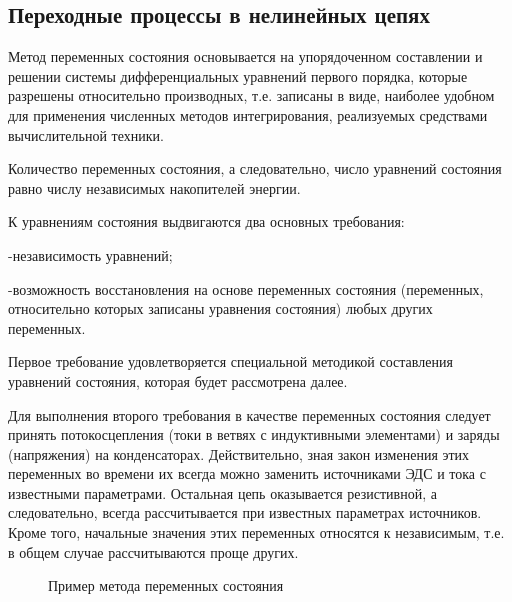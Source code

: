 \subsection{Переходные процессы в нелинейных цепях}



Метод переменных состояния основывается на упорядоченном составлении и решении системы дифференциальных уравнений первого порядка, которые разрешены относительно производных, т.е. записаны в виде, наиболее удобном для применения численных методов интегрирования, реализуемых средствами вычислительной техники.

Количество переменных состояния, а следовательно, число уравнений состояния равно числу независимых накопителей энергии.

К уравнениям состояния выдвигаются два основных требования:

-независимость уравнений;

-возможность восстановления на основе переменных состояния (переменных, относительно которых записаны уравнения состояния) любых других переменных.

Первое требование удовлетворяется специальной методикой составления уравнений состояния, которая будет рассмотрена далее.

Для выполнения второго требования в качестве переменных состояния следует принять потокосцепления (токи в ветвях с индуктивными элементами) и заряды (напряжения) на конденсаторах. Действительно, зная закон изменения этих переменных во времени их всегда можно заменить источниками ЭДС и тока с известными параметрами. Остальная цепь оказывается резистивной, а следовательно, всегда рассчитывается при известных параметрах источников. Кроме того, начальные значения этих переменных относятся к независимым, т.е. в общем случае рассчитываются проще других.

\begin{center}
	\begin{figure}[h!]
		\caption{Пример метода переменных состояния}	
	\end{figure}
\end{center}


\pagebreak
